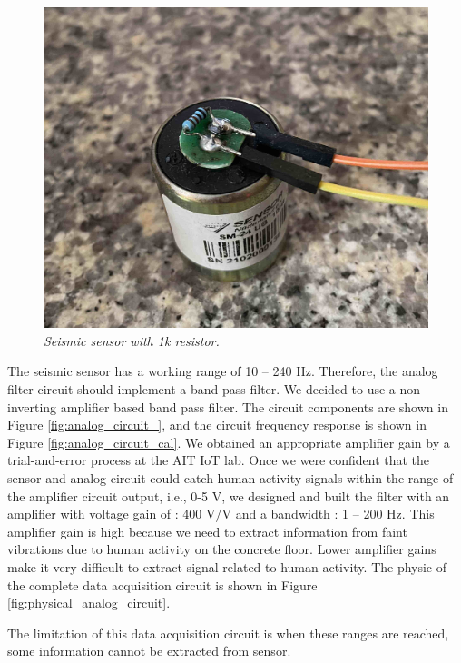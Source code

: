 \begin{figure}[H]
  \centering
  \caption[Seismic sensor with 1k resistor.]{\emph{Seismic sensor with 1k resistor. }}\label{fig:seismic_res}
  \includegraphics[scale = 0.13]{figures/seismic_res_low.jpg}
\end{figure}


The seismic sensor has a working range of 10 -- 240 Hz. Therefore, the analog filter circuit should implement a band-pass filter. We decided to use a non-inverting amplifier based band pass filter. The circuit components are shown in Figure \ref{fig:analog_circuit_}, and the circuit frequency response is shown in Figure \ref{fig:analog_circuit_cal}. We obtained an appropriate amplifier gain by a trial-and-error process at the AIT IoT lab. Once we were confident that the sensor and analog circuit could catch human activity signals within the range of the amplifier circuit output, i.e., 0-5 V, we designed and built the filter with an amplifier with voltage gain of : 400 V/V and a bandwidth : 1 -- 200 Hz. This amplifier gain is high because we need to extract information from faint vibrations due to human activity on the concrete floor. Lower amplifier gains make it very difficult to extract signal related to human activity. The physic of the complete data acquisition circuit is shown in Figure \ref{fig:physical_analog_circuit}.


The limitation of this data acquisition circuit is when these ranges are reached, some information cannot be extracted from sensor.


